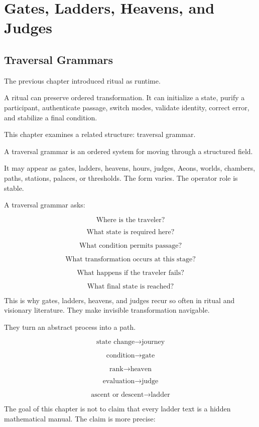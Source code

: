 \documentclass[11pt]{book}
\begin{document}
\chapter{Gates, Ladders, Heavens, and Judges}

\section{Traversal Grammars}

The previous chapter introduced ritual as runtime.

A ritual can preserve ordered transformation. It can initialize a state, purify a participant, authenticate passage, switch modes, validate identity, correct error, and stabilize a final condition.

This chapter examines a related structure: traversal grammar.

A traversal grammar is an ordered system for moving through a structured field.

It may appear as gates, ladders, heavens, hours, judges, Aeons, worlds, chambers, paths, stations, palaces, or thresholds. The form varies. The operator role is stable.

A traversal grammar asks:

\[
\text{Where is the traveler?}
\]

\[
\text{What state is required here?}
\]

\[
\text{What condition permits passage?}
\]

\[
\text{What transformation occurs at this stage?}
\]

\[
\text{What happens if the traveler fails?}
\]

\[
\text{What final state is reached?}
\]

This is why gates, ladders, heavens, and judges recur so often in ritual and visionary literature. They make invisible transformation navigable.

They turn an abstract process into a path.

\[
\text{state change} \rightarrow \text{journey}
\]

\[
\text{condition} \rightarrow \text{gate}
\]

\[
\text{rank} \rightarrow \text{heaven}
\]

\[
\text{evaluation} \rightarrow \text{judge}
\]

\[
\text{ascent or descent} \rightarrow \text{ladder}
\]

The goal of this chapter is not to claim that every ladder text is a hidden mathematical manual. The claim is more precise:
\end{document}
